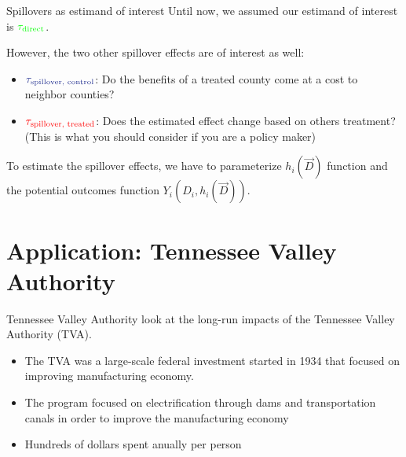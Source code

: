 \documentclass[aspectratio=43]{beamer}
\begin{document}






\begin{frame}{Spillovers as estimand of interest}
    Until now, we assumed our estimand of interest is $\textcolor{green}{\tau_{\text{direct}}}$.

    However, the two other spillover effects are of interest as well:
    \begin{itemize}
        \item $\textcolor{purple}{\tau_{\text{spillover, control}}}$: Do the benefits of a treated county come at a cost to neighbor counties? 
        
        \item $\textcolor{red}{\tau_{\text{spillover, treated}}}$: Does the estimated effect change based on others treatment? (This is what you should consider if you are a policy maker)
    \end{itemize}

    To estimate the spillover effects, we have to parameterize $h_i(\vec{D})$ function and the potential outcomes function $Y_i(D_i, h_i(\vec{D}))$.
\end{frame}





\section{Application: Tennessee Valley Authority}

\begin{frame}{Tennessee Valley Authority}
    \citet{Kline_Moretti_2014} look at the long-run impacts of the Tennessee Valley Authority (TVA).

    \begin{itemize}
        \item The TVA was a large-scale federal investment started in 1934 that focused on improving manufacturing economy.
        
        \item The program focused on electrification through dams and transportation canals in order to improve the manufacturing economy
        
        \item Hundreds of dollars spent anually per person
    \end{itemize}
\end{frame}
\end{document}
